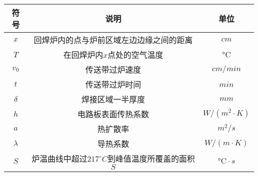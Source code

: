 \documentclass[../main.tex]{subfiles}
\begin{document}
\begin{table}[H]
    \centering
    \renewcommand{\arrayrulewidth}{2.0pt}
    \begin{tabular}{ccc}
   \hline
    符号 & 说明 & 单位  \\ 
    \hline
      $x$                 & 回焊炉内的点与炉前区域左边边缘之间的距离                   & $ cm$                      \\
    $T$                   & 在回焊炉内$x$点处的空气温度                  &  $°\text{C}$                   \\
    $v_0$                    & 传送带过炉速度          & $cm/min$                      \\
$t$      & 传送带过炉时间                  & $min $                     \\
 $\delta$                      & 焊接区域一半厚度                     & $mm $              \\
 $h$                  & 电路板表面传热系数           & $W/\left( m^2\cdot K \right) $                     \\
$a$             &   热扩散率     & $m^2/s$                     \\
$\lambda$                    & 导热系数        & $W/\left( m\cdot K \right) $                     \\
$S$                   & 炉温曲线中超过$217^{\circ}C$到峰值温度所覆盖的面积$S$                     & $°\text{C}\cdot s$                      \\
   \hline
    \end{tabular}
    \end{table}
\end{document}
